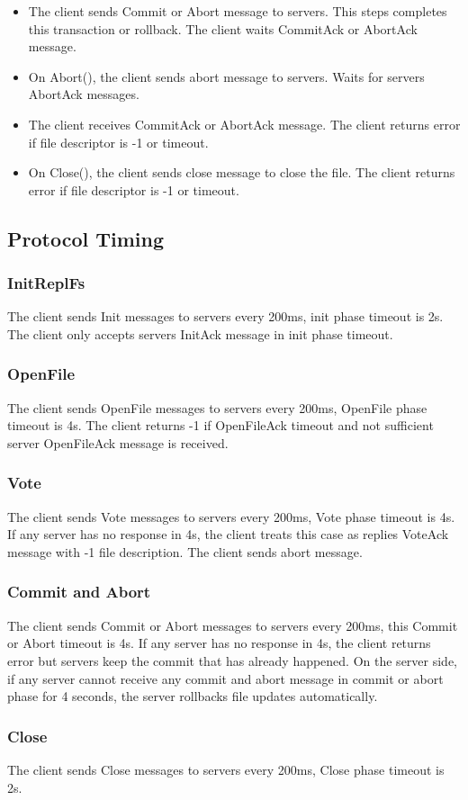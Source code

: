 \documentclass[12pt,fleqn]{article}
\begin{document}
\begin{itemize}
	\item The client sends Commit or Abort message to servers. This steps completes this transaction or rollback. The client waits CommitAck or AbortAck message.
	\item On Abort(), the client sends abort message to servers. Waits for servers AbortAck messages.
	\item The client receives CommitAck or AbortAck message. The client returns error if file descriptor is -1 or timeout.
	\item  On Close(), the client sends close message to close the file. The client returns error if file descriptor is -1 or timeout.
\end{itemize}

\subsection{Protocol Timing}
\subsubsection{InitReplFs}
The client sends Init messages to servers every 200ms, init phase timeout is 2s. The client only accepts servers InitAck message in init phase timeout.

\subsubsection{OpenFile}
The client sends OpenFile messages to servers every 200ms, OpenFile phase timeout is 4s. The client returns -1 if OpenFileAck timeout and not sufficient server OpenFileAck message is received.

\subsubsection{Vote}
The client sends Vote messages to servers every 200ms, Vote phase timeout is 4s. If any server has no response in 4s, the client treats this case as replies VoteAck message with -1 file description. The client sends abort message.

\subsubsection{Commit and Abort}
The client sends Commit or Abort messages to servers every 200ms, this Commit or Abort timeout is 4s. If any server has no response in 4s, the client returns error but servers keep the commit that has already happened. On the server side, if any server cannot receive any commit and abort message in commit or abort phase for 4 seconds, the server rollbacks file updates automatically.
 
 \subsubsection{Close}
The client sends Close messages to servers every 200ms, Close phase timeout is 2s. 
 
\end{document}
